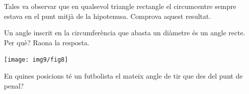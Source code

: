 \begin{mylist}
\exer  Tales va observar que en qualsevol triangle rectangle el circumcentre sempre estava en el punt mitjà de la hipotenusa. Comprova aquest resultat.

\vspace{-1.5cm}
\exer \begin{minipage}[t]{0.7\textwidth}
	Un angle inscrit en la circumferència que abasta un diàmetre és un angle recte. Per què? Raona la resposta.
\end{minipage}
\begin{minipage}{0.3\textwidth}
	\centering
	\vspace{1.5cm}
\texttt{[image: img9/fig8]}
\end{minipage}


\exer  En quines posicions té un futbolista el mateix angle de tir que des del punt de penal?

\end{mylist}
